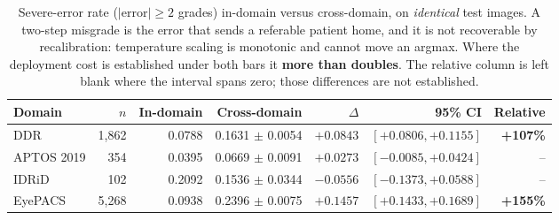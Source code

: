 \begin{table}[t]
\centering
\caption{Severe-error rate ($|\text{error}| \geq 2$ grades) in-domain versus cross-domain, on \emph{identical} test images. A two-step misgrade is the error that sends a referable patient home, and it is not recoverable by recalibration: temperature scaling is monotonic and cannot move an argmax. Where the deployment cost is established under both bars it \textbf{more than doubles}. The relative column is left blank where the interval spans zero; those differences are not established.}
\label{tab:severe}
\begin{tabular}{lrrrrrr}
\toprule
Domain & $n$ & In-domain & Cross-domain & $\Delta$ & 95\% CI & Relative \\
\midrule
DDR & 1,862 & 0.0788 & 0.1631 $\pm$ 0.0054 & $+0.0843$ & $[+0.0806, +0.1155]$ & \textbf{+107\%} \\
APTOS 2019 & 354 & 0.0395 & 0.0669 $\pm$ 0.0091 & $+0.0273$ & $[-0.0085, +0.0424]$ & -- \\
IDRiD & 102 & 0.2092 & 0.1536 $\pm$ 0.0344 & $-0.0556$ & $[-0.1373, +0.0588]$ & -- \\
EyePACS & 5,268 & 0.0938 & 0.2396 $\pm$ 0.0075 & $+0.1457$ & $[+0.1433, +0.1689]$ & \textbf{+155\%} \\
\bottomrule
\end{tabular}
\end{table}